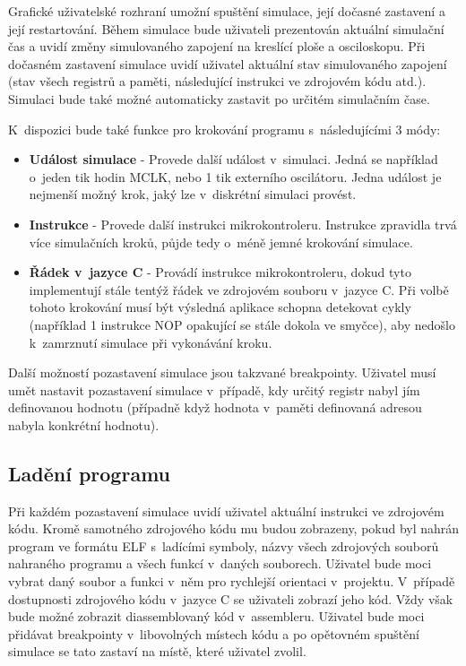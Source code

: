 Grafické uživatelské rozhraní umožní spuštění simulace, její dočasné zastavení a její restartování. Během simulace bude uživateli prezentován aktuální simulační čas a uvidí změny simulovaného zapojení na kreslící ploše a osciloskopu. Při dočasném zastavení simulace uvidí uživatel aktuální
stav simulovaného zapojení (stav všech registrů a paměti, následující instrukci ve zdrojovém kódu atd.). Simulaci bude také možné automaticky zastavit po určitém simulačním čase.

K~dispozici bude také funkce pro krokování programu s~následujícími 3 módy:

\begin{itemize}
\item \textbf{Událost simulace} - Provede další událost v~simulaci. Jedná se například o~jeden tik hodin MCLK, nebo 1 tik externího oscilátoru. Jedna událost je nejmenší možný krok, jaký lze v~diskrétní simulaci provést.
\item \textbf{Instrukce} - Provede další instrukci mikrokontroleru. Instrukce zpravidla trvá více simulačních kroků, půjde tedy o~méně jemné krokování simulace.
\item \textbf{Řádek v~jazyce C} - Provádí instrukce mikrokontroleru, dokud tyto implementují stále tentýž řádek ve zdrojovém souboru v~jazyce C. Při volbě tohoto krokování musí být výsledná aplikace schopna detekovat cykly (například 1 instrukce NOP opakující se stále dokola ve smyčce), aby nedošlo k~zamrznutí simulace při vykonávání kroku.
\end{itemize}

Další možností pozastavení simulace jsou takzvané breakpointy. Uživatel musí umět nastavit pozastavení simulace v~případě, kdy určitý registr nabyl jím definovanou hodnotu (případně když hodnota v~paměti definovaná adresou nabyla konkrétní hodnotu).

\subsection{Ladění programu}

Při každém pozastavení simulace uvidí uživatel aktuální instrukci ve zdrojovém kódu. Kromě samotného zdrojového kódu mu budou zobrazeny, pokud byl nahrán program ve formátu ELF s~ladícími symboly, názvy všech zdrojových souborů nahraného programu a všech funkcí v~daných souborech. Uživatel bude moci vybrat daný soubor a funkci v~něm pro rychlejší orientaci v~projektu. V~případě dostupnosti zdrojového kódu v~jazyce C se uživateli zobrazí jeho kód. Vždy však bude možné zobrazit diassemblovaný kód v~assembleru. Uživatel bude moci přidávat breakpointy v~libovolných místech kódu a po opětovném spuštění simulace se tato zastaví na místě, které uživatel zvolil.

